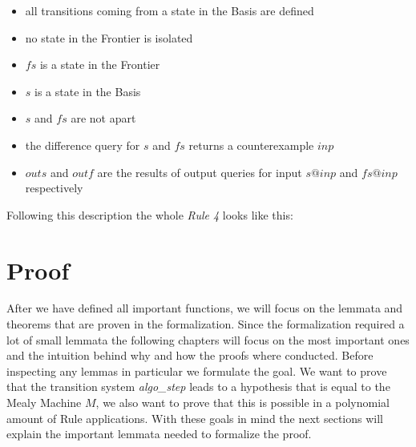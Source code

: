 \begin{itemize}
	\item all transitions coming from a state in the Basis are defined
	\item no state in the Frontier is isolated
	\item $fs$ is a state in the Frontier
	\item $s$ is a state in the Basis
	\item $s$ and $fs$ are not apart
	\item the difference query for $s$ and $fs$ returns a counterexample $inp$
	\item $outs$ and $outf$ are the results of output queries for input $s@inp$ and $fs@inp$ respectively 
\end{itemize}
Following this description the whole \textit{Rule 4} looks like this: 
\begin{myisabelle}
\end{myisabelle}
\section{Proof}
After we have defined all important functions, we will focus on the lemmata and theorems that are proven in the formalization. Since the formalization required a lot of small lemmata the following chapters will focus on the most important ones and the intuition behind why and how the proofs where conducted. Before inspecting any lemmas in particular we formulate the goal. We want to prove that the transition system \textit{algo\_step} leads to a hypothesis that is equal to the Mealy Machine $M$, we also want to prove that this is possible in a polynomial amount of Rule applications. With these goals in mind the next sections will explain the important lemmata needed to formalize the proof.
